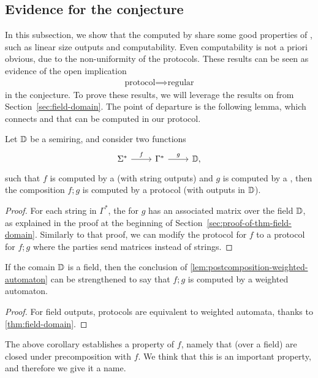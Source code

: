 \subsection{Evidence for the conjecture}
\label{sec:continuity}
\AP
In this subsection, we show that the  computed by
 share some  good properties of , such as linear size
outputs and computability. Even computability is not a priori obvious, due to
the non-uniformity of the protocols. These results can be seen as evidence of
the open implication 
\begin{align*}
\text{protocol} \implies \text{regular}
\end{align*}
in the conjecture. To prove these results, we will leverage the results on
 from Section~\ref{sec:field-domain}. The point of
departure is the following lemma, which connects  and
 that can be computed in our protocol.

    \begin{lemma}
        \label{lem:postcomposition-weighted-automaton}
        Let $\mathbb D$ be a semiring, and consider two functions
        \[
        \begin{tikzcd}
        \Sigma^* 
        \ar[r,"f"]
        &
        \Gamma^*
        \ar[r,"g"]
        & 
        \domain,
        \end{tikzcd}
        \]
        such that $f$ is computed by a  (with string outputs) and $g$ is computed by a , then the composition  $f;g$ is computed by a protocol (with outputs in $\mathbb D$).
    \end{lemma}
    \begin{proof}
      For each string in $\Gamma^*$, the  for $g$ has an
      associated matrix over the field $\mathbb D$, as explained in the proof at the beginning of Section~\ref{sec:proof-of-thm-field-domain}. Similarly to that proof, we can modify the protocol for $f$ to a protocol for $f;g$ where the parties send matrices instead of strings. 
    \end{proof}

\begin{corollary}\label{cor:protocol-field-continuity}
    If the comain $\mathbb D$ is a field, then the conclusion of \cref{lem:postcomposition-weighted-automaton} can be strengthened to say that $f;g$ is computed by a weighted automaton.
\end{corollary}
\begin{proof}
    For field outputs, protocols are equivalent to weighted automata, thanks to \cref{thm:field-domain}.
\end{proof}
The above corollary establishes a property of $f$, namely that 
(over a field) are closed under precomposition with $f$. We think that this is
an important property, and therefore we give it a name.

